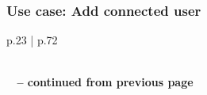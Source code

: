 \documentclass[11pt,a4paper]{report}
\begin{document}
\subsubsection{Use case: Add connected user}

\begin{longtable}{p{} | p{}}
    \caption{Use case: Add connected user} \label{tab:ucAddUsr} \\
    \endfirsthead
        {{\bfseries \tablename\ \thetable{} -- continued from previous page}} \\
         \\
    \endhead
         \\ 
    \endfoot
    \endlastfoot
    

\end{longtable}
\end{document}
